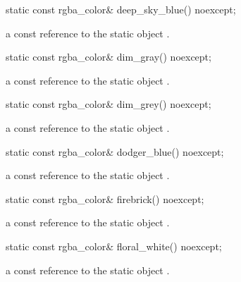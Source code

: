 \begin{itemdecl}
static const rgba_color& deep_sky_blue() noexcept;
\end{itemdecl}
\begin{itemdescr}
\pnum
\returns
a const reference to the static  object .
\end{itemdescr}

\begin{itemdecl}
static const rgba_color& dim_gray() noexcept;
\end{itemdecl}
\begin{itemdescr}
\pnum
\returns
a const reference to the static  object .
\end{itemdescr}

\begin{itemdecl}
static const rgba_color& dim_grey() noexcept;
\end{itemdecl}
\begin{itemdescr}
\pnum
\returns
a const reference to the static  object .
\end{itemdescr}

\begin{itemdecl}
static const rgba_color& dodger_blue() noexcept;
\end{itemdecl}
\begin{itemdescr}
\pnum
\returns
a const reference to the static  object .
\end{itemdescr}

\begin{itemdecl}
static const rgba_color& firebrick() noexcept;
\end{itemdecl}
\begin{itemdescr}
\pnum
\returns
a const reference to the static  object .
\end{itemdescr}

\begin{itemdecl}
static const rgba_color& floral_white() noexcept;
\end{itemdecl}
\begin{itemdescr}
\pnum
\returns
a const reference to the static  object .
\end{itemdescr}


